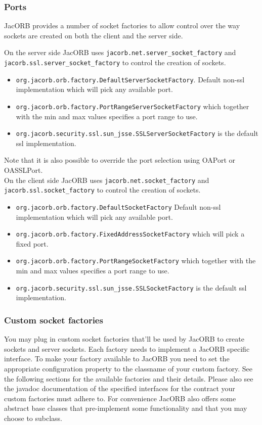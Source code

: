 \subsubsection{Ports}
JacORB provides a number of socket factories to allow control over the way
sockets are created on both the client and the server side.

On the server side JacORB uses {\tt jacorb.net.server\_socket\_factory} and
{\tt jacorb.ssl.server\_socket\_factory} to control the creation of sockets.
\begin{itemize}
\item {\tt org.jacorb.orb.factory.DefaultServerSocketFactory}. Default non-ssl implementation
which will pick any available port.
\item {\tt org.jacorb.orb.factory.PortRangeServerSocketFactory} which
together with the min and max values specifies a port range to use.
\item {\tt org.jacorb.security.ssl.sun\_jsse.SSLServerSocketFactory} is the default ssl implementation.
\end{itemize}
Note that it is also possible to override the port selection using OAPort or OASSLPort.\\

On the client side JacORB uses {\tt jacorb.net.socket\_factory} and {\tt
jacorb.ssl.socket\_factory} to control the creation of sockets.
\begin{itemize}
\item {\tt org.jacorb.orb.factory.DefaultSocketFactory} Default non-ssl implementation
which will pick any available port.
\item {\tt org.jacorb.orb.factory.FixedAddressSocketFactory} which will pick a fixed port.
\item {\tt org.jacorb.orb.factory.PortRangeSocketFactory} which together with the min and max values specifies a port range to use.
\item {\tt org.jacorb.security.ssl.sun\_jsse.SSLSocketFactory} is the default ssl implementation.
\end{itemize}

\subsubsection{Custom socket factories}
\label{sec:customSocketFactories}

You may plug in custom socket factories that'll be used by JacORB to
create sockets and server sockets. Each factory needs to implement a JacORB specific
interface. To make your factory available to JacORB you need to set the appropriate
configuration property to the classname of your custom factory. See the following
sections for the available factories and their details. Please also see the javadoc documentation
of the specified interfaces for the contract your custom factories must adhere to.
For convenience JacORB also offers some abstract base classes that pre-implement some functionality and that you
may choose to subclass.

